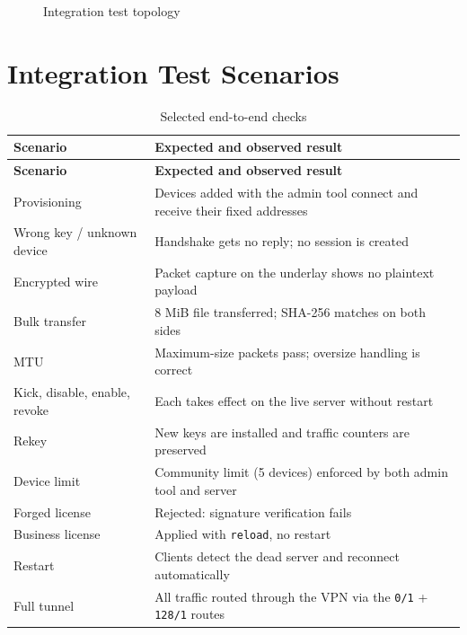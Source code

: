 \documentclass[12pt,a4paper]{report}
\begin{document}
\begin{figure}[H]
\centering
{}
\caption{Integration test topology}
\end{figure}

\section{Integration Test Scenarios}
\begin{longtable}{@{}p{5.5cm}p{9cm}@{}}
\caption{Selected end-to-end checks}\\
\toprule
\textbf{Scenario} & \textbf{Expected and observed result}\\
\midrule
\endfirsthead
\toprule
\textbf{Scenario} & \textbf{Expected and observed result}\\
\midrule
\endhead
Provisioning & Devices added with the admin tool connect and receive their fixed addresses\\
Wrong key / unknown device & Handshake gets no reply; no session is created\\
Encrypted wire & Packet capture on the underlay shows no plaintext payload\\
Bulk transfer & 8 MiB file transferred; SHA-256 matches on both sides\\
MTU & Maximum-size packets pass; oversize handling is correct\\
Kick, disable, enable, revoke & Each takes effect on the live server without restart\\
Rekey & New keys are installed and traffic counters are preserved\\
Device limit & Community limit (5 devices) enforced by both admin tool and server\\
Forged license & Rejected: signature verification fails\\
Business license & Applied with \texttt{reload}, no restart\\
Restart & Clients detect the dead server and reconnect automatically\\
Full tunnel & All traffic routed through the VPN via the \texttt{0/1} + \texttt{128/1} routes\\
\bottomrule
\end{longtable}
\end{document}
